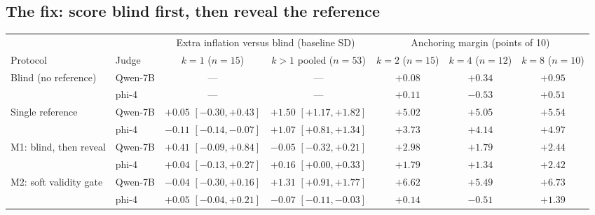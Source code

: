 \documentclass[11pt]{article}
\begin{document}
\FloatBarrier
\subsection{The fix: score blind first, then reveal the reference}
\label{sec:struct}

\begin{table}[tbp]
\centering
\footnotesize
\setlength{\tabcolsep}{2pt}
\begin{tabular}{llccccc}
\toprule
& & \multicolumn{2}{c}{Extra inflation versus blind (baseline SD)} & \multicolumn{3}{c}{Anchoring margin (points of 10)} \\
\cmidrule(lr){3-4} \cmidrule(lr){5-7}
Protocol & Judge & $k{=}1$ ($n{=}15$) & $k{>}1$ pooled ($n{=}53$) & $k{=}2$ ($n{=}15$) & $k{=}4$ ($n{=}12$) & $k{=}8$ ($n{=}10$) \\
\midrule
Blind (no reference) & Qwen-7B & --- & --- & $+0.08$ & $+0.34$ & $+0.95$ \\
      & phi-4   & --- & --- & $+0.11$ & $-0.53$ & $+0.51$ \\
\addlinespace
Single reference & Qwen-7B & $+0.05$ {\scriptsize$[-0.30, +0.43]$} & $\mathbf{+1.50}$ {\scriptsize$[+1.17, +1.82]$} & $+5.02$ & $+5.05$ & $+5.54$ \\
                 & phi-4   & $-0.11$ {\scriptsize$[-0.14, -0.07]$} & $\mathbf{+1.07}$ {\scriptsize$[+0.81, +1.34]$} & $+3.73$ & $+4.14$ & $+4.97$ \\
\addlinespace
M1: blind, then reveal & Qwen-7B & $+0.41$ {\scriptsize$[-0.09, +0.84]$} & $\mathbf{-0.05}$ {\scriptsize$[-0.32, +0.21]$} & $+2.98$ & $+1.79$ & $+2.44$ \\
                       & phi-4   & $+0.04$ {\scriptsize$[-0.13, +0.27]$} & $\mathbf{+0.16}$ {\scriptsize$[+0.00, +0.33]$} & $+1.79$ & $+1.34$ & $+2.42$ \\
\addlinespace
M2: soft validity gate & Qwen-7B & $-0.04$ {\scriptsize$[-0.30, +0.16]$} & $+1.31$ {\scriptsize$[+0.91, +1.77]$} & $+6.62$ & $+5.49$ & $+6.73$ \\
                      & phi-4   & $+0.05$ {\scriptsize$[-0.04, +0.21]$} & $\mathbf{-0.07}$ {\scriptsize$[-0.11, -0.03]$} & $\mathbf{+0.14}$ & $-0.51$ & $+1.39$ \\
\bottomrule
\end{tabular}


\end{table}
\end{document}
